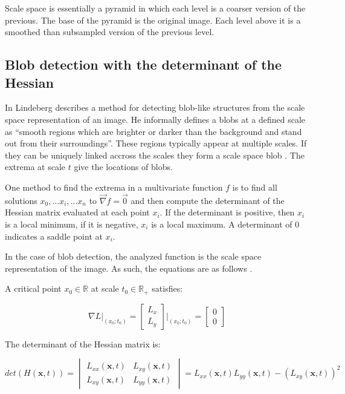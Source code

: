 Scale space is essentially a pyramid in which each level is a coarser version of the previous. The base of the pyramid is the original image. Each level above it is a smoothed than subsampled version of the previous level.

\subsection{Blob detection with the determinant of the Hessian}
\label{sec:blob_theory}

In \cite{Lindeberg93detectingsalient} Lindeberg describes a method for detecting blob-like structures from the scale space representation of an image. He informally defines a blobs at a defined scale as ``smooth regions which are brighter or darker than the background and stand out from their surroundings''. These regions typically appear at multiple scales. If they can be uniquely linked accross the scales they form a scale space blob \cite{Lindeberg93detectingsalient}. The extrema at scale $t$ give the locations of blobs.

One method to find the extrema in a multivariate function $f$ is to find all solutions $x_0, ... x_i, ... x_n$ to $\vec\nabla f = \vec0$ and then compute the determinant of the Hessian matrix evaluated at each point $x_i$. If the determinant is positive, then $x_i$ is a local minimum, if it is negative, $x_i$ is a local maximum. A determinant of 0 indicates a saddle point at $x_i$.

In the case of blob detection, the analyzed function is the scale space representation of the image. As such, the equations are as follows \cite{Lindeberg93detectingsalient}.

A critical point $x_0 \in \mathbb{R}$ at scale $t_0 \in \mathbb{R}_+$ satisfies:

\begin{equation}
    \nabla L\rvert_{(x_0; t_0)} =
    \begin{bmatrix}
        L_{x} \\ L_{y}
    \end{bmatrix} \Bigg\rvert_{(x_0; t_0)} =
    \begin{bmatrix}
        0 \\ 0
    \end{bmatrix}
\end{equation}

The determinant of the Hessian matrix is:

\begin{equation}
    det(H(\mathbf{x},t)) =
    \begin{vmatrix}
        L_{xx}(\mathbf{x},t) & L_{xy}(\mathbf{x},t) \\
        L_{xy}(\mathbf{x},t) & L_{yy}(\mathbf{x},t)
    \end{vmatrix}
    =
    L_{xx}(\mathbf{x},t) L_{yy}(\mathbf{x},t) - (L_{xy}(\mathbf{x},t))^2
\end{equation}

